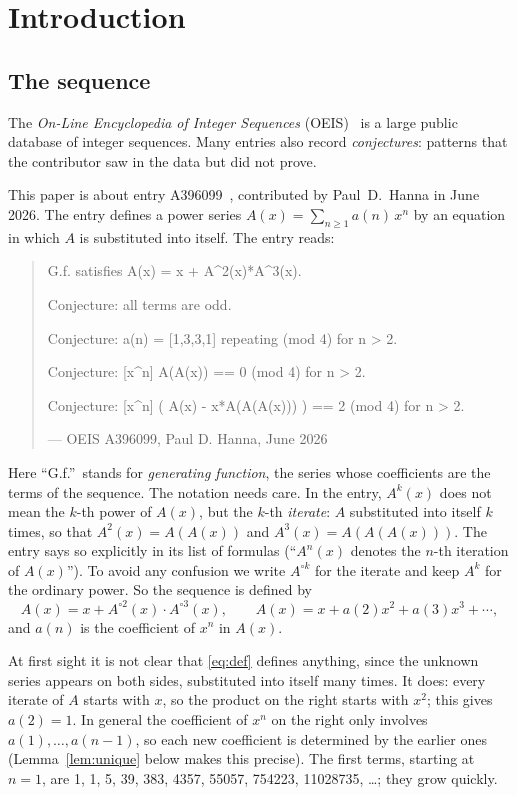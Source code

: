 \documentclass[11pt,a4paper]{article}
\theoremstyle{definition}
\theoremstyle{remark}
\begin{document}
\section{Introduction}

\subsection{The sequence}\label{sec:sequence}
The \emph{On-Line Encyclopedia of Integer Sequences} (OEIS)~\cite{oeisdb} is a large public database of integer
sequences. Many
entries also record \emph{conjectures}: patterns that the contributor saw in the data but did not prove.

This paper is about entry A396099~\cite{oeis}, contributed by Paul~D.~Hanna in June 2026.
The entry defines a power series $A(x)=\sum_{n\ge1}a(n)\,x^n$ by an equation in which $A$ is substituted into
itself. The entry reads:
\begin{quote}\small\ttfamily\raggedright G.f. satisfies A(x) = x + A\^{}2(x)*A\^{}3(x).\par\smallskip Conjecture: all terms are odd.\par\smallskip Conjecture: a(n) = [1,3,3,1] repeating (mod 4) for n > 2.\par\smallskip Conjecture: [x\^{}n] A(A(x)) == 0 (mod 4) for n > 2.\par\smallskip Conjecture: [x\^{}n] ( A(x) - x*A(A(A(x))) ) == 2 (mod 4) for n > 2.\par\smallskip\hfill\textrm{--- OEIS A396099, Paul D. Hanna, June 2026}\end{quote}

Here ``G.f.''\ stands for \emph{generating function}, the series whose coefficients are the terms of the sequence.
The notation needs care. In the entry, $A^k(x)$ does not mean the $k$-th power of $A(x)$, but the $k$-th
\emph{iterate}: $A$ substituted into itself $k$ times, so that $A^2(x)=A(A(x))$ and $A^3(x)=A(A(A(x)))$. The entry
says so explicitly in its list of formulas (``$A^n(x)$ denotes the $n$-th iteration of $A(x)$''). To avoid any
confusion we write $A^{\circ k}$ for the iterate and keep $A^k$ for the ordinary power. So the sequence is defined by
\begin{equation}\label{eq:def}
A(x)=x+A^{\circ2}(x)\cdot A^{\circ3}(x),\qquad A(x)=x+a(2)x^2+a(3)x^3+\cdots,
\end{equation}
and $a(n)$ is the coefficient of $x^n$ in $A(x)$.

At first sight it is not clear that \eqref{eq:def} defines anything, since the unknown series appears on both sides,
substituted into itself many times. It does: every iterate
of $A$ starts with $x$, so the product on the right starts with $x^2$; this gives $a(2)=1$. In general the
coefficient of $x^n$ on the right only involves $a(1),\dots,a(n-1)$, so each new coefficient is determined by the
earlier ones (Lemma~\ref{lem:unique} below makes this precise). The first terms, starting at $n=1$, are
1, 1, 5, 39, 383, 4357, 55057, 754223, 11028735, \dots; they grow quickly.
\end{document}

